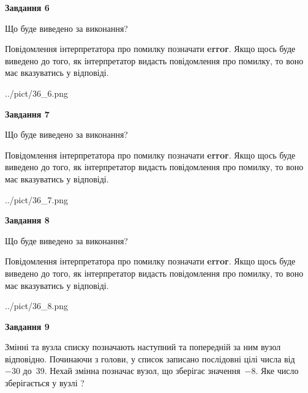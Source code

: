 \documentclass[12pt, ukrainian]{article}
\begin{document}
{\begin {large}
{\begin {center}\textbf{Завдання 6}\end {center}}\par
Що буде виведено за виконання?

Повідомлення інтерпретатора про помилку позначати \textbf{error}.
Якщо щось буде виведено до того, як інтерпретатор видасть повідомлення про помилку, 
то воно має вказуватись у відповіді. \par


\begin{center}
	{../pict/36_6.png}
\end{center}
\newpage

{\begin {center}\textbf{Завдання 7}\end {center}}\par
Що буде виведено за виконання?

Повідомлення інтерпретатора про помилку позначати \textbf{error}.
Якщо щось буде виведено до того, як інтерпретатор видасть повідомлення про помилку, 
то воно має вказуватись у відповіді. \par


\begin{center}
	{../pict/36_7.png}
\end{center}
\newpage

{\begin {center}\textbf{Завдання 8}\end {center}}\par
Що буде виведено за виконання?

Повідомлення інтерпретатора про помилку позначати \textbf{error}.
Якщо щось буде виведено до того, як інтерпретатор видасть повідомлення про помилку, 
то воно має вказуватись у відповіді. \par


\begin{center}
	{../pict/36_8.png}
\end{center}
\newpage

{\begin {center}\textbf{Завдання 9}\end {center}}\par
Змінні  та  вузла списку позначають наступний та попередній за ним вузол відповідно. Починаючи з голови, у список записано послідовні цілі числа від~$-30$ до~$39$. Нехай змінна  позначає вузол, що зберігає значення~$-8$.
Яке число зберігається у вузлі  ?\par
\newpage


\end{large}}
\end{document}
